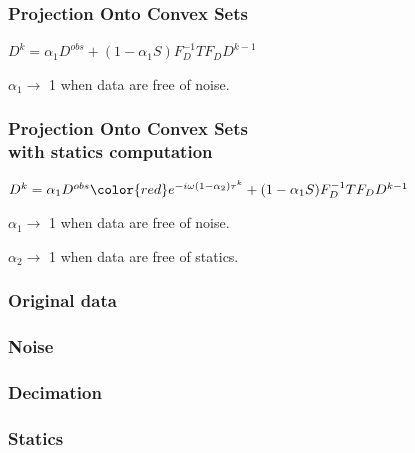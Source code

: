 
\begin{frame} \frametitle{Projection Onto Convex Sets}
    \Large{$D^{k} = \alpha_1 D^{obs} + (1-\alpha_1 S)F_{D}^{-1}TF_{D}D^{k-1}$}

\bigskip

\bigskip
$\alpha_1 \rightarrow$ 1  when data are free of noise.
\end{frame}

\begin{frame} \frametitle{Projection Onto Convex Sets\\ {\color{red}with statics computation}}
    \Large{$D^{k} = \alpha_1 D^{obs}{\color{red}e^{-i\omega(1-\alpha_2)\tau^k}} + (1-\alpha_1 S)F_{D}^{-1}TF_{D}D^{k-1}$}

\bigskip

\bigskip
$\alpha_1 \rightarrow$ 1  when data are free of noise.
{\color{red}

$\alpha_2 \rightarrow$ 1  when data are free of statics.}
\end{frame}


\begin{frame} \frametitle{Original data}
\end{frame}

\begin{frame} \frametitle{Noise}
\end{frame}

\begin{frame} \frametitle{Decimation}
\end{frame}

\begin{frame} \frametitle{Statics}
\end{frame}

%
%

